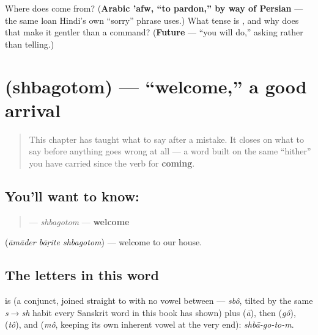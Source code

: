 \begin{tcolorbox}[breakable,colback=teal!4,colframe=teal!35!black,title={Before you move on}]
Where does  come from? (\textbf{Arabic 'afw, \textquotedblleft{}to pardon,\textquotedblright{} by way of Persian} — the same loan Hindi's own \textquotedblleft{}sorry\textquotedblright{} phrase uses.) What tense is , and why does that make it gentler than a command? (\textbf{Future} — \textquotedblleft{}you will do,\textquotedblright{} asking rather than telling.)
\end{tcolorbox}
\section[shbagotom]{ (shbagotom) — \textquotedblleft{}welcome,\textquotedblright{} a good arrival}

\label{lesson:BN-C13-sbagotom}



\begin{quote}
This chapter has taught what to say after a mistake. It closes on what to say before anything goes wrong at all — a word built on the same \textquotedblleft{}hither\textquotedblright{} you have carried since the verb for \textbf{coming}.
\end{quote}

\subsection*{You'll want to know: }
\begin{quote}
\textbf{} — \emph{shbagotom} — \textbf{welcome}
\end{quote}

   (\emph{āmāder bāṛite shbagotom}) — welcome to our house.

\subsection*{The letters in this word}
\textbf{} is \textbf{} (a conjunct,  joined straight to  with no vowel between — \emph{sbô}, tilted by the same \emph{s$\to$sh} habit every Sanskrit word in this book has shown) plus \textbf{} (\emph{ā}), then \textbf{} (\emph{gô}), \textbf{} (\emph{tô}), and \textbf{} (\emph{mô}, keeping its own inherent vowel at the very end): \emph{shbā-go-to-m}.


